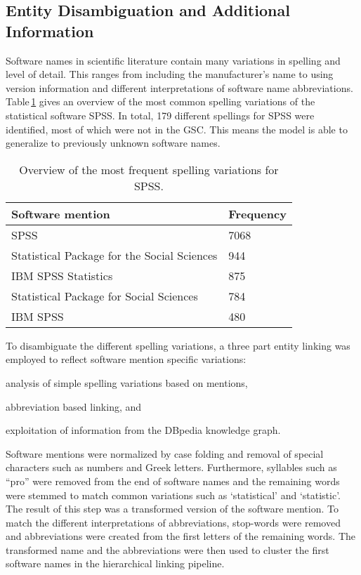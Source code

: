 \documentclass[runningheads]{llncs}
\newcommand{\tabref}[1]{Table\,\ref{#1}}
\begin{document}
\subsection{Entity Disambiguation and Additional Information}
Software names in scientific literature contain many variations in spelling and level of detail.
This ranges from including the manufacturer's name to using version information and different interpretations of software name abbreviations.
\tabref{tab:spss_variations} gives an overview of the most common spelling variations of the statistical software SPSS.
In total, 179 different spellings for SPSS were identified, most of which were not in the GSC.
This means the model is able to generalize to previously unknown software names. 
\begin{table}[tb]
    \centering
    \caption{Overview of the most frequent spelling variations for SPSS.}
    \label{tab:spss_variations}
    \begin{tabularx}{.72\textwidth}{p{7cm}p{2cm}}
        \toprule
        Software mention & Frequency\\
        \midrule
        SPSS & 7068\\
        Statistical Package for the Social Sciences & 944\\
        IBM SPSS Statistics & 875\\
        Statistical Package for Social Sciences & 784\\
        IBM SPSS & 480 \\
        \bottomrule
    \end{tabularx}
\end{table}

To disambiguate the different spelling variations, a three part entity linking was employed to reflect software mention specific variations:
\begin{inparaenum}[1.)]
    \item analysis of simple spelling variations based on mentions,
    \item abbreviation based linking, and
    \item exploitation of information from the DBpedia knowledge graph.
\end{inparaenum}
Software mentions were normalized by case folding and removal of special characters such as numbers and Greek letters.
Furthermore, syllables such as ``pro'' were removed from the end of software names and the remaining words were stemmed to match common variations such as `statistical' and `statistic'.
The result of this step was a transformed version of the software mention.
To match the different interpretations of abbreviations, stop-words were removed and abbreviations were created from the first letters of the remaining words.
The transformed name and the abbreviations were then used to cluster the first software names in the hierarchical linking pipeline.
\end{document}
